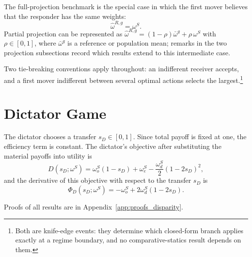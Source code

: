 \documentclass[11pt]{article}
\theoremstyle{plain}
\theoremstyle{remark}
\begin{document}
The full-projection benchmark is the special case in which the first mover believes that the responder has the same weights:
\[
        \hat\omega^{R,g}=\omega^S.
\]
Partial projection can be represented as $\hat\omega^{R,g}=(1-\rho)\bar\omega^g+\rho\,\omega^S$ with $\rho\in[0,1]$, where $\bar\omega^g$ is a reference or population mean; remarks in the two projection subsections record which results extend to this intermediate case.

Two tie-breaking conventions apply throughout: an indifferent receiver accepts, and a first mover indifferent between several optimal actions selects the largest.\footnote{Both are knife-edge events: they determine which closed-form branch applies exactly at a regime boundary, and no comparative-statics result depends on them.}

\section{Dictator Game}

The dictator chooses a transfer $s_D\in[0,1]$.  Since total payoff is fixed at one, the efficiency term is constant.  The dictator's objective after substituting the material payoffs into utility is
\begin{equation}
\label{eq:D_objective}
        D(s_D;\omega^S)
        =
        \omega_o^S(1-s_D)
        +\omega_e^S
        -\frac{\omega_d^S}{2}(1-2s_D)^2 ,
\end{equation}
and the derivative of this objective with respect to the transfer $s_D$ is
\begin{equation}
\label{eq:D_phi}
        \Phi_D(s_D;\omega^S)
        =
        -\omega_o^S
        +2\omega_d^S(1-2s_D).
\end{equation}

Proofs of all results are in Appendix~\ref{app:proofs_disparity}.
\end{document}

